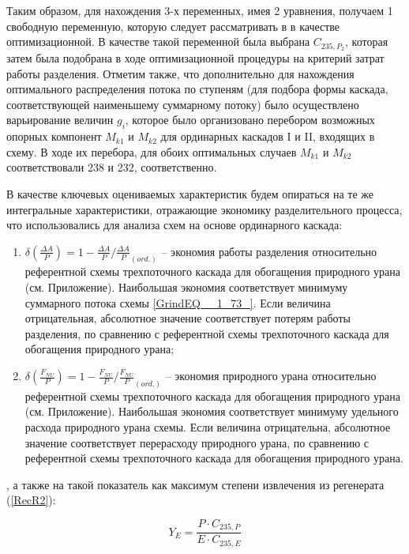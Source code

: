 Таким образом, для нахождения 3-х переменных, имея 2 уравнения, получаем 1 свободную переменную, которую следует рассматривать в в качестве оптимизационной. В качестве такой переменной была выбрана $C_{235, P_2}$, которая затем была подобрана в ходе оптимизационной процедуры на критерий затрат работы разделения. Отметим также, что дополнительно для нахождения оптимального распределения потока по ступеням (для подбора формы каскада, соответствующей наименьшему суммарному потоку) было осуществлено варьирование величин $g_{i}$, которое было организовано перебором возможных опорных компонент $M_{k1}$ и $M_{k2}$ для ординарных каскадов I и II, входящих в схему. В ходе их перебора, для обоих оптимальных случаев $M_{k1}$ и $M_{k2}$ соответствовали 238 и 232, соответственно.


В качестве ключевых оцениваемых характеристик будем опираться на те же интегральные характеристики, отражающие экономику разделительного процесса, что использовались для анализа схем на основе ординарного каскада:

\begin{enumerate}
  \item $\delta(\frac{\Delta A}{P})=1-\frac{\Delta A}{P}/\frac{\Delta A}{P}_{(ord.)}$ -- экономия работы разделения относительно референтной схемы трехпоточного каскада для обогащения природного урана (см. Приложение). Наибольшая экономия соответствует минимуму суммарного потока схемы \ref{GrindEQ__1_73_}. Если величина отрицательная, абсолютное значение соответствует потерям работы разделения, по сравнению с референтной схемы трехпоточного каскада для обогащения природного урана;
  \item $\delta(\frac{F_{NU}}{P})=1-\frac{F_{NU}}{P}/\frac{F_{NU}}{P}_{(ord.)}$ -- экономия природного урана относительно референтной схемы трехпоточного каскада для обогащения природного урана (см. Приложение).  Наибольшая экономия соответствует минимуму удельного расхода природного урана схемы. Если величина отрицательна, абсолютное значение соответствует перерасходу природного урана, по сравнению с референтной схемы трехпоточного каскада для обогащения природного урана.
\end{enumerate}

, а также на такой показатель как максимум степени извлечения из регенерата (\ref{RecR2}):

\begin{equation} \label{RecR2} 
    Y_{E} = \frac{P\cdot C_{235,P}}{E \cdot C_{235,E}}        
\end{equation} 

